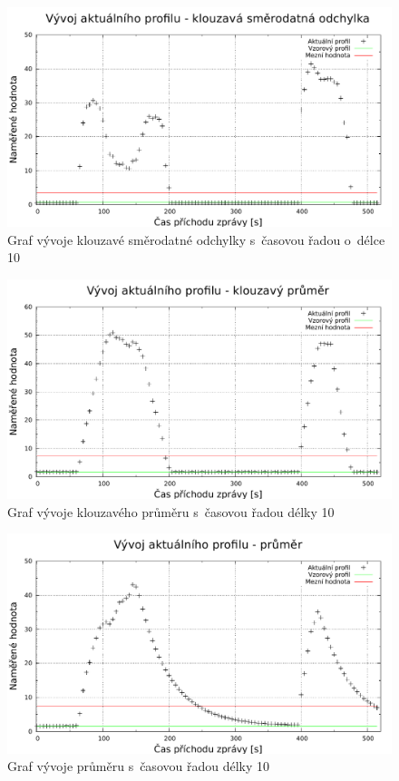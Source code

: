    \begin{figure}[ht]
   \begin{center}
   \includegraphics[scale=0.7]{pictures/moving_standard_deviation_progress}
   \caption[Graf vývoje klouzavé směrodatné odchylky]{Graf vývoje klouzavé směrodatné odchylky s~časovou řadou o~délce 10}
   \label{obr.progressStandardDeviation}
   \end{center}
   \end{figure}
    
  \begin{figure}[ht]
   \begin{center}
   \includegraphics[scale=0.7]{pictures/moving_average_progress}
   \caption[Graf vývoje klouzavého průměru]{Graf vývoje klouzavého průměru s~časovou řadou délky 10}
   \label{obr.progressAverage}
   \end{center}
   \end{figure}
   
   \begin{figure}[ht]
   \begin{center}
   \includegraphics[scale=0.7]{pictures/average_progress}
   \caption[Graf vývoje průměru]{Graf vývoje průměru s~časovou řadou délky 10}
   \label{obr.progressCumAverage}
   \end{center}
   \end{figure}